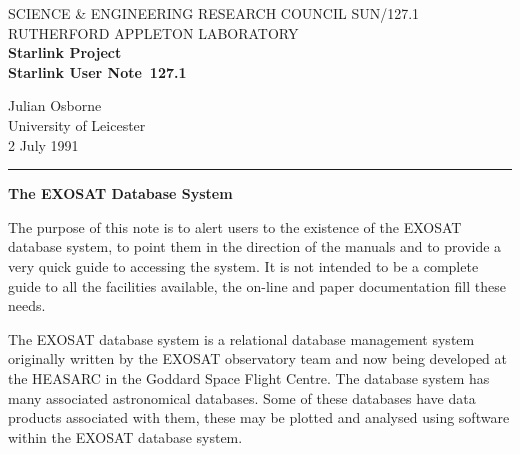 \pagestyle{myheadings}

\newcommand{\stardoccategory}  {Starlink User Note}
\newcommand{\stardocinitials}  {SUN}
\newcommand{\stardocnumber}    {127.1}
\newcommand{\stardocauthors}   {Julian Osborne}
\newcommand{\stardocdate}      {2 July 1991}
\newcommand{\stardoctitle}     {The EXOSAT Database System}

\newcommand{\stardocname}{\stardocinitials /\stardocnumber}
\renewcommand{\_}{{\tt\char'137}}     %
\markright{\stardocname}
\setlength{\textwidth}{160mm}
\setlength{\textheight}{240mm}
\setlength{\topmargin}{-5mm}
\setlength{\oddsidemargin}{0mm}
\setlength{\evensidemargin}{0mm}
\setlength{\parindent}{0mm}
\setlength{\parskip}{\medskipamount}
\setlength{\unitlength}{1mm}


\thispagestyle{empty}
SCIENCE \& ENGINEERING RESEARCH COUNCIL \hfill \stardocname\\
RUTHERFORD APPLETON LABORATORY\\
{\large\bf Starlink Project\\}
{\large\bf \stardoccategory\ \stardocnumber}
\begin{flushright}
\stardocauthors\\
University of Leicester\\
\stardocdate
\end{flushright}
\vspace{-4mm}
\rule{\textwidth}{0.5mm}
\vspace{5mm}
\begin{center}
{\Large\bf \stardoctitle}
\end{center}
\vspace{5mm}

The purpose of this note is to alert users to the existence of the EXOSAT 
database system, to point them in the direction of the manuals and to 
provide a very quick guide to accessing the system. It is not intended to be 
a complete guide to all the facilities available, the on-line 
and paper documentation fill these needs.

The EXOSAT database system is a relational database management system 
originally written by the EXOSAT observatory team and now being developed 
at the HEASARC in the Goddard Space Flight Centre. The database system has 
many associated 
astronomical databases. Some of these databases have data 
products associated with them, these may be plotted and analysed using 
software within the EXOSAT database system. 

